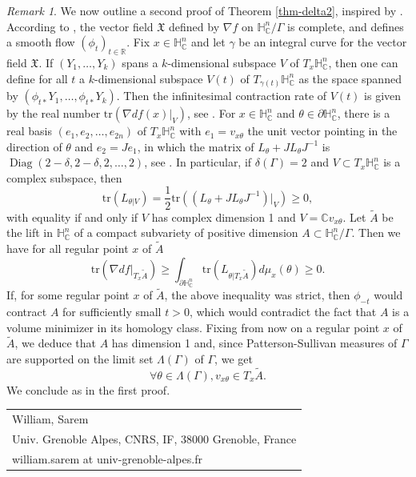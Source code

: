 \documentclass{article}
\theoremstyle{definition}
\theoremstyle{remark}
\newtheorem*{remark}{Remark}
\newcommand{\C}{\mathbb{C}}
\newcommand{\R}{\mathbb{R}}
\newcommand{\HNC}{\mathbb{H}^{n}_{\C}}
\newcommand{\PHNC}{\partial\mathbb{H}^{n}_{\C}}
\newcommand{\tr}{\text{tr}}
\begin{document}
\begin{remark}
		We now outline a second proof of Theorem \ref{thm-delta2}, inspired by \cite[Theorem 1.5]{connellNaturalFlowCritical2023}. According to \cite[Lemma 2.2]{connellNaturalFlowCritical2023}, the vector field $\mathfrak{X}$ defined by $\nabla{f}$ on $\HNC/\Gamma$ is complete, and defines a smooth flow $(\phi_t)_{t\in \R}$. Fix $x\in \HNC$ and let $\gamma$ be an integral curve for the vector field $\mathfrak{X}$. If $(Y_1,\dots,Y_k)$ spans a $k$-dimensional subspace $V$ of $T_x\HNC$, then one can define for all $t$ a $k$-dimensional subspace $V(t)$ of $T_{\gamma(t)}\HNC$ as the space spanned by $(\phi_{t\ast}Y_1,\dots,\phi_{t\ast}Y_k)$. Then the infinitesimal contraction rate of $V(t)$ is given by the real number $\tr(\nabla d{f}(x)\vert_{ V})$, see \cite[Lemma 2.5]{connellNaturalFlowCritical2023}.  For $x\in \HNC$ and $\theta\in \PHNC$, there is a real basis $(e_1,e_2,\dots,e_{2n})$ of $T_{x}\HNC$ with $e_1=v_{x\theta}$ the unit vector pointing in the direction of $\theta$ and $e_2=Je_1$, in which the matrix of $L_{\theta} + JL_{\theta}J^{-1}$ is
		$\operatorname{Diag}(2-\delta,2-\delta,2,\dots,2)$, see \cite[proof of Lemma 2.6]{connellNaturalFlowCritical2023}.
		In particular, if $\delta(\Gamma)=2$ and $V\subset T_x\HNC$ is a complex subspace, then\begin{equation*}
			\tr(L_{\theta\vert V}) = \frac{1}{2}\tr\left((L_{\theta} + JL_{\theta}J^{-1})\vert_{ V}\right) \ge 0,
		\end{equation*}
		with equality if and only if $V$ has complex dimension 1 and $V=\C v_{x\theta}$.
		Let $\widetilde{A}$ be the lift in $\HNC$ of a compact subvariety of positive dimension $A\subset\HNC/\Gamma$. Then we have for all regular point $x$ of $\widetilde{A}$\begin{equation*}
			\tr(\nabla d{f}\vert_{ T_x\widetilde{A}}) \ge \int_{\PHNC}\tr(L_{\theta\vert T_x\widetilde{A}})d\mu_x(\theta) \ge 0.
		\end{equation*}
		If, for some regular point $x$ of $\widetilde{A}$, the above inequality was strict, then $\phi_{-t}$ would contract $A$ for sufficiently small $t>0$, which would contradict the fact that $A$ is a volume minimizer in its homology class. Fixing from now on a regular point $x$ of $\widetilde{A}$, we deduce that $A$ has dimension 1 and, since Patterson-Sullivan measures of $\Gamma$ are supported on the limit set $\Lambda(\Gamma)$ of $\Gamma$, we get\begin{equation*}
			\forall \theta \in \Lambda(\Gamma), v_{x\theta} \in T_x\widetilde{A}.
		\end{equation*}
	We conclude as in the first proof.
\end{remark}
\vspace{-0.5cm}


	
	\vspace{.1cm}
	\begin{small}\begin{tabular}{l}
			William, Sarem\\
			Univ. Grenoble Alpes, CNRS, IF, 38000 Grenoble, France\\
			william.sarem at univ-grenoble-alpes.fr
		\end{tabular}
	\end{small}		
\end{document}
